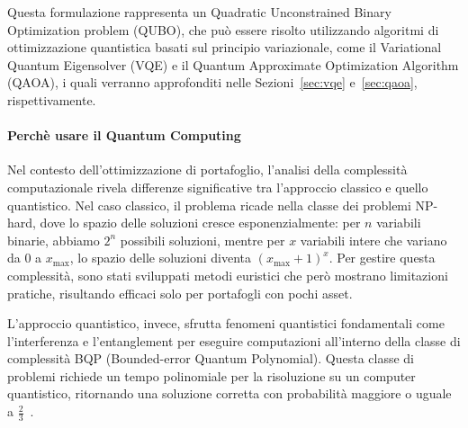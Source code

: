 Questa formulazione rappresenta un Quadratic Unconstrained Binary Optimization 
problem (QUBO), che può essere risolto utilizzando algoritmi di ottimizzazione 
quantistica basati sul principio variazionale, come il Variational Quantum Eigensolver 
(VQE) e il Quantum Approximate Optimization Algorithm (QAOA), i quali verranno
approfonditi nelle Sezioni~\ref{sec:vqe} e~\ref{sec:qaoa}, rispettivamente.


\paragraph{Perchè usare il Quantum Computing}
Nel contesto dell'ottimizzazione di portafoglio, l'analisi della complessità 
computazionale rivela differenze significative tra l'approccio classico e quello 
quantistico. Nel caso classico, il problema ricade nella classe dei problemi NP-hard, 
dove lo spazio delle soluzioni cresce esponenzialmente: per $n$ variabili binarie, 
abbiamo $2^n$ possibili soluzioni, mentre per $x$ variabili intere che variano da 
0 a $x_{\max}$, lo spazio delle soluzioni diventa $(x_{\max}+1)^x$. 
Per gestire questa complessità, sono stati sviluppati metodi euristici che però mostrano 
limitazioni pratiche, risultando efficaci solo per portafogli con pochi asset.

L'approccio quantistico, invece, sfrutta fenomeni quantistici fondamentali 
come l'interferenza e l'entanglement per eseguire computazioni all'interno della 
classe di complessità BQP (Bounded-error Quantum Polynomial). 
Questa classe di problemi richiede un tempo polinomiale per la risoluzione su un 
computer quantistico, ritornando una soluzione corretta con probabilità maggiore 
o uguale a $\frac{2}{3}$~\cite{buonaiuto2023best}.

